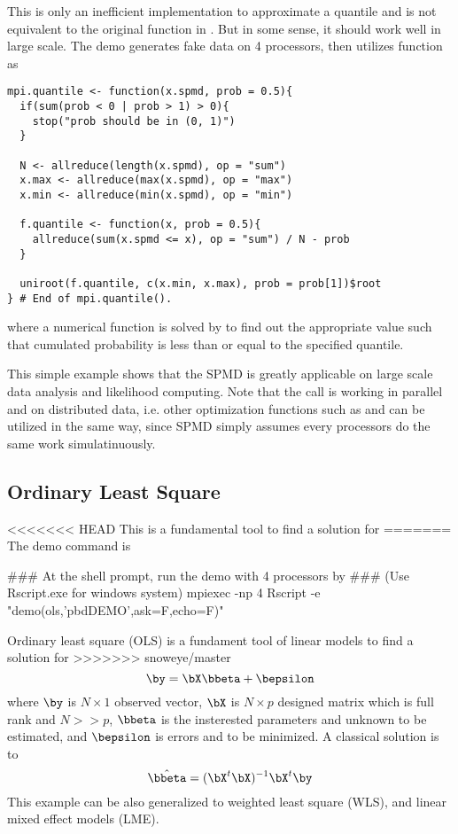 This is only an inefficient implementation to approximate a quantile
and is not equivalent to the original  function in
. But in some sense, it should work well in large scale.
The demo  generates fake data on 4 processors, then
utilizes  function as
\begin{lstlisting}[language=rr,title=R Code]
mpi.quantile <- function(x.spmd, prob = 0.5){
  if(sum(prob < 0 | prob > 1) > 0){
    stop("prob should be in (0, 1)")
  }

  N <- allreduce(length(x.spmd), op = "sum")
  x.max <- allreduce(max(x.spmd), op = "max")
  x.min <- allreduce(min(x.spmd), op = "min")

  f.quantile <- function(x, prob = 0.5){
    allreduce(sum(x.spmd <= x), op = "sum") / N - prob
  }

  uniroot(f.quantile, c(x.min, x.max), prob = prob[1])$root
} # End of mpi.quantile().
\end{lstlisting}
where a numerical function is solved by  to find out
the appropriate value such that cumulated probability is less than
or equal to the specified quantile.

This simple example shows that the SPMD is greatly applicable on large
scale data analysis and likelihood computing.
Note that the  call is working in parallel and on distributed
data, i.e. other optimization functions such as  and 
can be utilized in the same way,
since SPMD simply assumes every processors do the same work
simulatinuously.




\subsection[Ordinary Least Square]{Ordinary Least Square}
\label{sec:ols}

<<<<<<< HEAD
This is a fundamental tool to find a solution for
=======
The demo command is
\begin{Command}
### At the shell prompt, run the demo with 4 processors by
### (Use Rscript.exe for windows system)
mpiexec -np 4 Rscript -e "demo(ols,'pbdDEMO',ask=F,echo=F)"
\end{Command}

Ordinary least square (OLS)
is a fundament tool of linear models to find a solution for
>>>>>>> snoweye/master
$$\by = \bX\bbeta + \bepsilon$$
where $\by$ is $N\times 1$ observed vector,
$\bX$ is $N\times p$ designed matrix which is full rank and $N >> p$,
$\bbeta$ is the insterested parameters and unknown to be estimated,
and $\bepsilon$ is errors and to be minimized.
A classical solution is to
$$
\hat{\bbeta} = (\bX^t\bX)^{-1}\bX^t\by
$$
This example can be also generalized to weighted least square (WLS),
and linear mixed effect models (LME).

